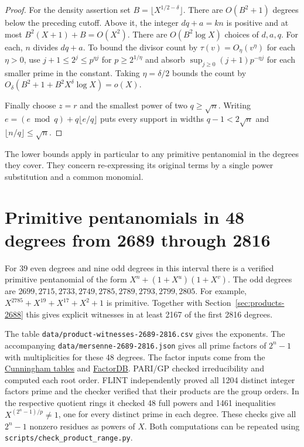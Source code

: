 \documentclass[11pt]{article}
\begin{document}
\begin{proof}
For the density assertion set \(B=\lfloor X^{1/2-\delta}\rfloor\).
There are \(O(B^2+1)\) degrees below the preceding cutoff.
Above it, the integer \(dq+a=kn\) is positive and at most
\(B^2(X+1)+B=O(X^2)\). There are \(O(B^2\log X)\) choices of
\(d,a,q\). For each, \(n\) divides \(dq+a\). To bound the divisor
count by \(\tau(v)=O_\eta(v^\eta)\) for each \(\eta>0\), use
\(j+1\le2^j\le p^{\eta j}\) for \(p\ge 2^{1/\eta}\) and absorb
\(\sup_{j\ge0}(j+1)p^{-\eta j}\) for each smaller prime in the constant.
Taking \(\eta=\delta/2\) bounds the count by
\(O_\delta(B^2+1+B^2 X^\delta\log X)=o(X)\).

Finally choose \(z=r\) and the smallest power of two \(q\ge\sqrt n\).
Writing \(e=(e\bmod q)+q\lfloor e/q\rfloor\) puts every support
in widths \(q-1<2\sqrt n\) and \(\lfloor n/q\rfloor\le\sqrt n\).
\end{proof}
The lower bounds apply in particular to any primitive pentanomial
in the degrees they cover. They concern re-expressing its original
terms by a single power substitution and a common monomial.

\section{Primitive pentanomials in 48 degrees from 2689 through 2816}
\label{sec:products-2816}
For 39 even degrees and nine odd degrees in this interval there is
a verified primitive pentanomial of the form \(X^n+(1+X^u)(1+X^v)\).
The odd degrees are \(2699,2715,2733,2749,2785,2789,2793,2799,2805\).
For example, \(X^{2785}+X^{19}+X^{17}+X^2+1\) is primitive.
Together with Section~\ref{sec:products-2688} this gives explicit
witnesses in at least 2167 of the first 2816 degrees.

The table \nolinkurl{data/product-witnesses-2689-2816.csv} gives the
exponents. The accompanying \nolinkurl{data/mersenne-2689-2816.json}
gives all prime factors of \(2^n-1\) with multiplicities for these
48 degrees. The factor inputs come from the
\href{https://github.com/postvakje/Reformatted-Cunningham-Project-tables/tree/dff2e282ff15399b16b4fb840a410aa2a37076b7}{Cunningham tables}
and \href{https://factordb.com/index.php?query=2\%5E2785-1}{FactorDB}.
PARI/GP checked irreducibility and computed each root order.
FLINT independently proved all 1204 distinct integer factors prime
and the checker verified that their products are the group orders.
In the respective quotient rings it checked 48 full powers and 1461
inequalities \(X^{(2^n-1)/p}\ne1\), one for every distinct prime
in each degree. These checks give all \(2^n-1\) nonzero residues as
powers of \(X\). Both computations can be repeated using
\nolinkurl{scripts/check_product_range.py}.
\end{document}
